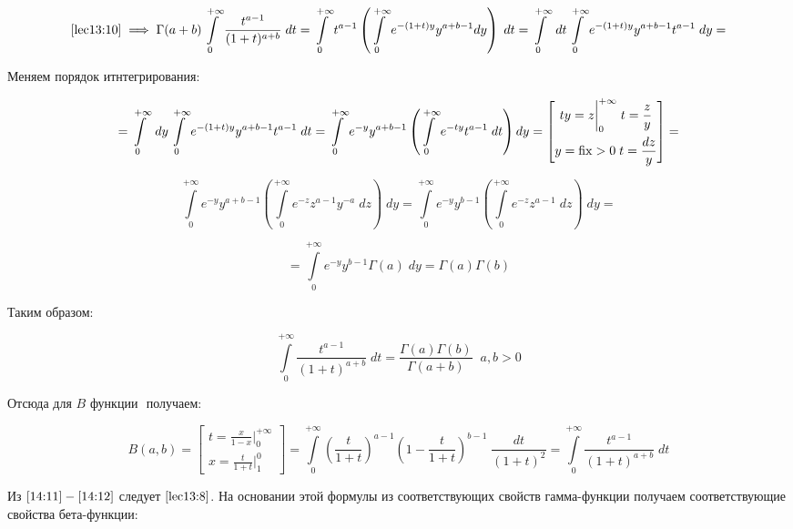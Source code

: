 \documentclass[../../main.tex]{subfiles}
\begin{document}
\[ \eqref{lec13:10} \implies \Gamma (a+b) \int\limits_{0}^{+\infty} \frac{ 
t^{a-1} }{ (1+t)^{a+b} } \; dt = \int\limits_{0}^{+\infty} t^{a-1} \left(  
\int\limits_{0}^{+\infty} e^{-(1+t)y } y^{a+b-1} dy \right) \; dt =  
\int\limits_{0}^{+\infty} \; dt  \int\limits_{0}^{+\infty} e^{ -(1+t)y } 
y^{a+b-1}  t^{a-1} \; dy = \]

Меняем порядок итнтегрирования:

\[ =  \int\limits_{0}^{+\infty} \; dy \int\limits_{0}^{+\infty} e^{ -(1+t)y } 
y^{a+b-1} t^{a-1} \; dt  = \int\limits_{0}^{+\infty} e^{-y} y^{a+b-1} \left( 
\int\limits_{0}^{+\infty} e^{-ty} t^{a-1} \; dt \right) dy = \left[  
\begin{gathered}
									ty = z \bigg|_{0}^{+\infty} \; t = \frac{z}{y}\\
									y = \operatorname{fix} > 0 \; t = \frac{dz}{y} 
										\end{gathered} \right] =   \]

\[  \int\limits_{0}^{+\infty} e^{-y} y^{a+b-1} \left( 
\int\limits_{0}^{+\infty} e^{-z} z^{a-1} y^{-a}  \; dz   \right) \; dy = 
\int\limits_{0}^{+\infty} e^{-y} y^{b-1} \left( \int\limits_{0}^{+\infty} 
e^{-z} z^{a-1}  \; dz \right) \; dy  =  \]


\[ = \int\limits_{0}^{+\infty} e^{-y} y^{b-1} \Gamma(a) \; dy = \Gamma(a) 
\Gamma(b)  \]

Таким образом:

\begin{equation}
	\label{14:11}
	\int\limits_{0}^{+\infty} \frac{ t^{a-1} }{ (1+t)^{a+b} } \; dt = 
	\frac{\Gamma(a) \Gamma(b)}{\Gamma(a+b)} \; \; a,b > 0
\end{equation}

Отсюда для $B$ функции $\label{13:6}$ получаем: 

\begin{equation}
\label{14:12}
   B(a,b) = \left[  \begin{gathered}
t = \frac{x}{1-x} \bigg|_{0}^{+\infty}\\
x = \frac{t}{1+t}  \bigg|_{1}^{0} 
\end{gathered}   \right]   = \int\limits_{0}^{+\infty} \left(  \frac{t}{1+t} 
\right)^{a-1} \left(1 - \frac{t}{1+t} \right)^{b-1} \; \frac{dt}{\left( 1+t 
\right)^2} = \int\limits_{0}^{+\infty} \frac{t^{a-1}}{\left( 1+t 
\right)^{a+b}} \; dt 
\end{equation}

Из  $\eqref{14:11} - \eqref{14:12}$ следует $\eqref{lec13:8}$. На основании 
этой 
формулы из соответствующих свойств гамма-функции получаем соответствующие 
свойства бета-функции:
\end{document}
